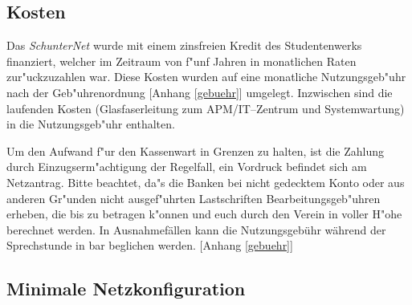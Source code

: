 \documentclass[12pt,titlepage,twoside]{scrartcl}
\begin{document}
\subsection{Kosten}

Das \emph{SchunterNet} wurde mit einem zinsfreien Kredit des Studentenwerks
finanziert, welcher im Zeitraum von f"unf Jahren in monatlichen Raten
zur"uckzuzahlen war. Diese Kosten wurden auf eine monatliche Nutzungsgeb"uhr
nach der Geb"uhrenordnung [Anhang \ref{gebuehr}] umgelegt. Inzwischen sind die laufenden Kosten 
(Glasfaserleitung zum APM/IT--Zentrum und Systemwartung) in die Nutzungsgeb"uhr enthalten. 

Um den Aufwand f"ur den Kassenwart in Grenzen zu halten, ist die Zahlung durch 
Einzugserm"achtigung der Regelfall, ein Vordruck befindet sich am Netzantrag.
Bitte beachtet, da"s die Banken bei nicht gedecktem Konto oder aus anderen
Gr"unden nicht ausgef"uhrten Lastschriften Bearbeitungsgeb"uhren erheben, die bis
zu  betragen k"onnen und euch durch den Verein in voller H"ohe
berechnet werden. In Ausnahmefällen kann die Nutzungsgebühr während der Sprechstunde in bar 
beglichen werden. [Anhang \ref{gebuehr}]

\subsection{Minimale Netzkonfiguration}
\end{document}
